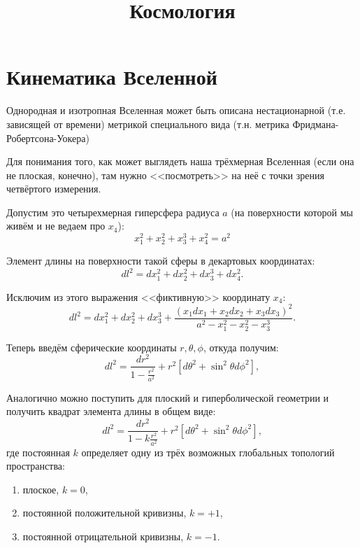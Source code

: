 \documentclass[]{article}
\title{Космология}
\date{}
\begin{document}
\maketitle

\section{Кинематика Вселенной}

Однородная и изотропная Вселенная может быть описана нестационарной (т.е. зависящей от времени) метрикой специального вида (т.н. метрика Фридмана-Робертсона-Уокера)

Для понимания того, как может выглядеть наша трёхмерная Вселенная (если она не плоская, конечно), там нужно <<посмотреть>> на неё с точки зрения четвёртого измерения.

Допустим это четырехмерная гиперсфера радиуса $a$ (на поверхности которой мы живём и не ведаем про $x_4$):
\begin{equation*}\label{}
    x_1^2 + x_2^2 + x_3^3 + x_4^2 = a^2
\end{equation*}

Элемент длины на поверхности такой сферы в декартовых координатах:
\begin{equation*}\label{}
    dl^2 = dx_1^2 + dx_2^2 + dx_3^3 + dx_4^2.
\end{equation*}

Исключим из этого выражения <<фиктивную>> координату $x_4$:
\begin{equation}\label{}
    dl^2 = dx_1^2 + dx_2^2 + dx_3^3 + \frac{(x_1dx_1 + x_2dx_2 + x_3dx_3)^2}{a^2 - x_1^2 - x_2^2 - x_3^3}.
\end{equation}

Теперь введём сферические координаты $r, \theta, \phi$, откуда получим:
\begin{equation*}\label{}
	dl^2=  \frac{dr^2}{1-\frac{r^2}{a^2}}+r^2\left[ d\theta^2+\sin^2\theta d\phi^2\right] ,
\end{equation*}

Аналогично можно поступить для плоский и гиперболической геометрии и получить квадрат элемента длины в общем виде:
\begin{equation*}\label{}
	dl^2=  \frac{dr^2}{1-k\frac{r^2}{a^2}}+r^2\left[ d\theta^2+\sin^2\theta d\phi^2\right] ,
\end{equation*}
где постоянная $k$ определяет одну из трёх возможных глобальных топологий пространства:
\begin{enumerate}
\item плоское, $k=0$,
\item постоянной положительной кривизны, $k=+1$,
\item постоянной отрицательной кривизны, $k=-1$.
\end{enumerate}
\end{document}
